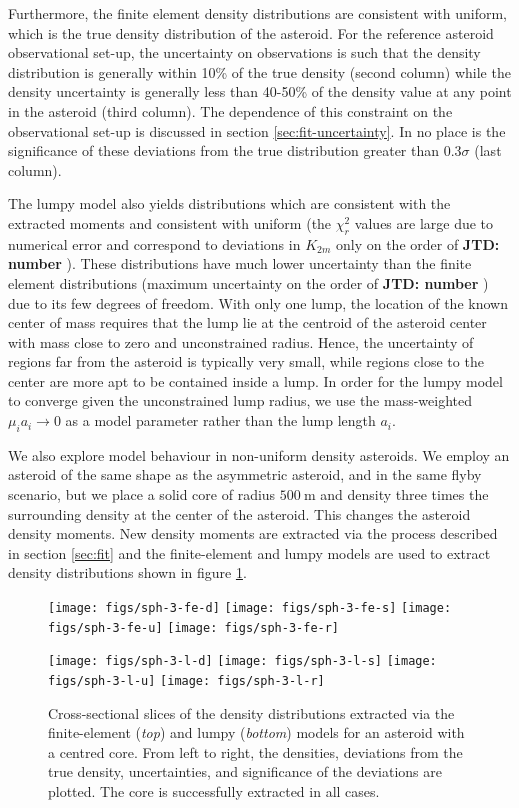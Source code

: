 \documentclass[fleqn,usenatbib]{mnras}
\newcommand{\jtd}[1]{ {\bf{\color{red} JTD: #1}} }
\begin{document}
Furthermore, the finite element density distributions are consistent with uniform, which is the true density distribution of the asteroid. For the reference asteroid observational set-up, the uncertainty on observations is such that the density distribution is generally within 10\% of the true density (second column) while the density uncertainty is generally less than 40-50\% of the density value at any point in the asteroid (third column). The dependence of this constraint on the observational set-up is discussed in section \ref{sec:fit-uncertainty}. In no place is the significance of these deviations from the true distribution greater than $0.3 \sigma$ (last column).

The lumpy model also yields distributions which are consistent with the extracted moments and consistent with uniform (the $\chi^2_r$ values are large due to numerical error and correspond to deviations in $K_{2m}$ only on the order of \jtd{number}). These distributions have much lower uncertainty than the finite element distributions (maximum uncertainty on the order of \jtd{number}) due to its few degrees of freedom. With only one lump, the location of the known center of mass requires that the lump lie at the centroid of the asteroid center with mass close to zero and unconstrained radius. Hence, the uncertainty of regions far from the asteroid is typically very small, while regions close to the center are more apt to be contained inside a lump. In order for the lumpy model to converge given the unconstrained lump radius, we use the mass-weighted $\mu_i a_i \rightarrow 0$ as a model parameter rather than the lump length $a_i$.

We also explore model behaviour in non-uniform density asteroids. We employ an asteroid of the same shape as the asymmetric asteroid, and in the same flyby scenario, but we place a solid core of radius $\SI{500}{\meter}$ and density three times the surrounding density at the center of the asteroid. This changes the asteroid density moments. New density moments are extracted via the process described in section \ref{sec:fit} and the finite-element and lumpy models are used to extract density distributions shown in figure \ref{fig:center-core}.
\begin{figure}
  \texttt{[image: figs/sph-3-fe-d]}\hfill
  \texttt{[image: figs/sph-3-fe-s]}\hfill
  \texttt{[image: figs/sph-3-fe-u]}\hfill
  \texttt{[image: figs/sph-3-fe-r]}

  \texttt{[image: figs/sph-3-l-d]}\hfill
  \texttt{[image: figs/sph-3-l-s]}\hfill
  \texttt{[image: figs/sph-3-l-u]}\hfill
  \texttt{[image: figs/sph-3-l-r]}

  \caption{Cross-sectional slices of the density distributions extracted via the finite-element (\textit{top}) and lumpy (\textit{bottom}) models for an asteroid with a centred core. From left to right, the densities, deviations from the true density, uncertainties, and significance of the deviations are plotted. The core is successfully extracted in all cases.}
  \label{fig:center-core}
\end{figure}
\end{document}
